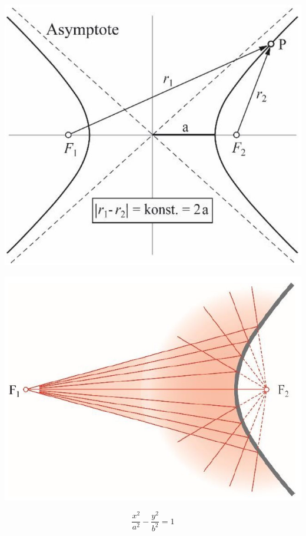 \begin{minipage}{0.4\linewidth}
\includegraphics[width=\linewidth]{Bilder/Wellen-Optik/hyperbolischer_spiegel} 
\end{minipage}
\hfill
\begin{minipage}{0.48\linewidth}
\includegraphics[width=\linewidth]{Bilder/Wellen-Optik/hyperbolischer_spiegel_2} 
\end{minipage}

$$ \boxed{ \frac{x^2}{a^2} - \frac{y^2}{b^2} = 1} $$



